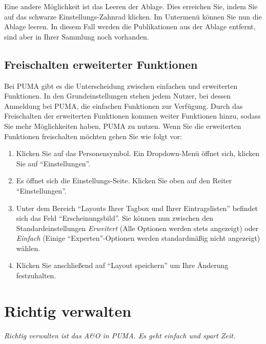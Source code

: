 \documentclass[b5paper,11pt,twoside]{scrbook} %
\begin{document}
Eine andere Möglichkeit ist das Leeren der Ablage. Dies erreichen Sie, indem Sie auf das schwarze Einstellungs-Zahnrad klicken. Im Untermenü können Sie nun die Ablage leeren. In diesem Fall werden die Publikationen aus der Ablage entfernt, sind aber in Ihrer Sammlung noch vorhanden.
\subsection{Freischalten erweiterter Funktionen}
Bei PUMA gibt es die Unterscheidung zwischen einfachen und erweiterten Funktionen. In den Grundeinstellungen stehen jedem Nutzer, bei dessen Anmeldung bei PUMA, die einfachen Funktionen zur Verfügung. Durch das Freischalten der erweiterten Funktionen kommen weiter Funktionen hinzu, sodass Sie mehr Möglichkeiten haben, PUMA zu nutzen.  Wenn Sie die erweiterten Funktionen freischalten möchten gehen Sie wie folgt vor:
\begin{enumerate}
    \item Klicken Sie auf das Personensymbol. Ein Dropdown-Menü öffnet sich, klicken Sie auf \enquote{Einstellungen}.
    \item Es öffnet sich die Einstellungs-Seite. Klicken Sie oben auf den Reiter \enquote{Einstellungen}.
    \item Unter dem Bereich \enquote{Layouts Ihrer Tagbox und Ihrer Eintragslisten} befindet sich das Feld \enquote{Erscheinungsbild}. Sie können nun zwischen den Standardeinstellungen \textit{Erweitert} (Alle Optionen werden stets angezeigt) oder \textit{Einfach} (Einige \enquote{Experten}-Optionen werden standardmäßig nicht angezeigt) wählen.
    \item Klicken Sie anschließend auf \enquote{Layout speichern} um Ihre Änderung festzuhalten.
\end{enumerate}
\newpage
\section{Richtig verwalten}
\textit{Richtig verwalten ist das A\&O in PUMA. Es geht einfach und spart Zeit.}
\end{document}

